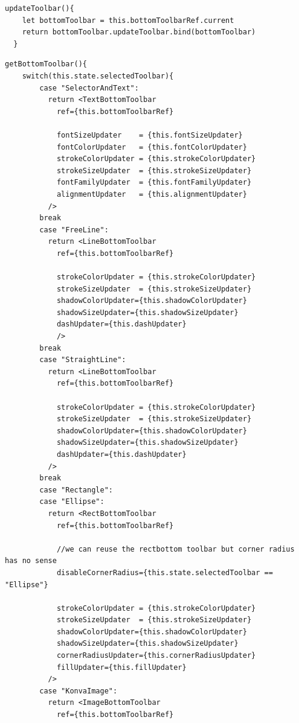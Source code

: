 \begin{lstlisting}[caption={Método updateToolbar del componente BottomToolbar general, que actua como interfaz devolviendo el updateToolbar de la toolbar activada}]
  updateToolbar(){
    let bottomToolbar = this.bottomToolbarRef.current
    return bottomToolbar.updateToolbar.bind(bottomToolbar)
  }
\end{lstlisting}

\begin{lstlisting}[caption={Switch del componente BottomToolbar principal que devuelve la BottomToolbar según el estado.}]
  getBottomToolbar(){
    switch(this.state.selectedToolbar){
        case "SelectorAndText":
          return <TextBottomToolbar 
            ref={this.bottomToolbarRef}

            fontSizeUpdater    = {this.fontSizeUpdater}
            fontColorUpdater   = {this.fontColorUpdater}
            strokeColorUpdater = {this.strokeColorUpdater}
            strokeSizeUpdater  = {this.strokeSizeUpdater}
            fontFamilyUpdater  = {this.fontFamilyUpdater}
            alignmentUpdater   = {this.alignmentUpdater}
          />
        break
        case "FreeLine":
          return <LineBottomToolbar 
            ref={this.bottomToolbarRef}

            strokeColorUpdater = {this.strokeColorUpdater}
            strokeSizeUpdater  = {this.strokeSizeUpdater}
            shadowColorUpdater={this.shadowColorUpdater}
            shadowSizeUpdater={this.shadowSizeUpdater}
            dashUpdater={this.dashUpdater}
            />
        break
        case "StraightLine":
          return <LineBottomToolbar 
            ref={this.bottomToolbarRef}

            strokeColorUpdater = {this.strokeColorUpdater}
            strokeSizeUpdater  = {this.strokeSizeUpdater}
            shadowColorUpdater={this.shadowColorUpdater}
            shadowSizeUpdater={this.shadowSizeUpdater}
            dashUpdater={this.dashUpdater}
          />
        break
        case "Rectangle":
        case "Ellipse":
          return <RectBottomToolbar
            ref={this.bottomToolbarRef}

            //we can reuse the rectbottom toolbar but corner radius has no sense
            disableCornerRadius={this.state.selectedToolbar == "Ellipse"}

            strokeColorUpdater = {this.strokeColorUpdater}
            strokeSizeUpdater  = {this.strokeSizeUpdater}
            shadowColorUpdater={this.shadowColorUpdater}
            shadowSizeUpdater={this.shadowSizeUpdater}
            cornerRadiusUpdater={this.cornerRadiusUpdater}
            fillUpdater={this.fillUpdater}
          />
        case "KonvaImage":
          return <ImageBottomToolbar 
            ref={this.bottomToolbarRef}


\end{lstlisting}

